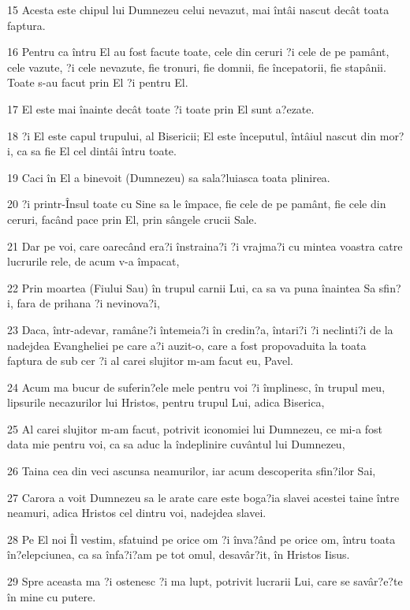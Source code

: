 \par 15 Acesta este chipul lui Dumnezeu celui nevazut, mai întâi nascut decât toata faptura.
\par 16 Pentru ca întru El au fost facute toate, cele din ceruri ?i cele de pe pamânt, cele vazute, ?i cele nevazute, fie tronuri, fie domnii, fie începatorii, fie stapânii. Toate s-au facut prin El ?i pentru El.
\par 17 El este mai înainte decât toate ?i toate prin El sunt a?ezate.
\par 18 ?i El este capul trupului, al Bisericii; El este începutul, întâiul nascut din mor?i, ca sa fie El cel dintâi întru toate.
\par 19 Caci în El a binevoit (Dumnezeu) sa sala?luiasca toata plinirea.
\par 20 ?i printr-Însul toate cu Sine sa le împace, fie cele de pe pamânt, fie cele din ceruri, facând pace prin El, prin sângele crucii Sale.
\par 21 Dar pe voi, care oarecând era?i înstraina?i ?i vrajma?i cu mintea voastra catre lucrurile rele, de acum v-a împacat,
\par 22 Prin moartea (Fiului Sau) în trupul carnii Lui, ca sa va puna înaintea Sa sfin?i, fara de prihana ?i nevinova?i,
\par 23 Daca, într-adevar, ramâne?i întemeia?i în credin?a, întari?i ?i neclinti?i de la nadejdea Evangheliei pe care a?i auzit-o, care a fost propovaduita la toata faptura de sub cer ?i al carei slujitor m-am facut eu, Pavel.
\par 24 Acum ma bucur de suferin?ele mele pentru voi ?i împlinesc, în trupul meu, lipsurile necazurilor lui Hristos, pentru trupul Lui, adica Biserica,
\par 25 Al carei slujitor m-am facut, potrivit iconomiei lui Dumnezeu, ce mi-a fost data mie pentru voi, ca sa aduc la îndeplinire cuvântul lui Dumnezeu,
\par 26 Taina cea din veci ascunsa neamurilor, iar acum descoperita sfin?ilor Sai,
\par 27 Carora a voit Dumnezeu sa le arate care este boga?ia slavei acestei taine între neamuri, adica Hristos cel dintru voi, nadejdea slavei.
\par 28 Pe El noi Îl vestim, sfatuind pe orice om ?i înva?ând pe orice om, întru toata în?elepciunea, ca sa înfa?i?am pe tot omul, desavâr?it, în Hristos Iisus.
\par 29 Spre aceasta ma ?i ostenesc ?i ma lupt, potrivit lucrarii Lui, care se savâr?e?te în mine cu putere.

